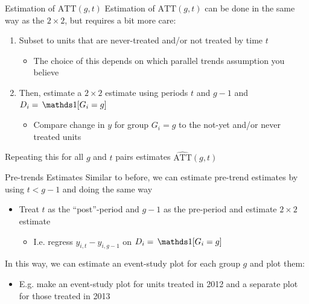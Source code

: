 \documentclass[aspectratio=169,t,11pt,table]{beamer}
\begin{document}
\begin{frame}{Estimation of $\text{ATT}(g,t)$}
  Estimation of $\text{ATT}(g,t)$ can be done in the same way as the $2 \times 2$, but requires a bit more care:

  \bigskip
  \begin{enumerate}
    \item Subset to units that are never-treated and/or not treated by time $t$ 
    \begin{itemize}
      \item The choice of this depends on which parallel trends assumption you believe
    \end{itemize}
 
    \item Then, estimate a $2 \times 2$ estimate using periods $t$ and $g - 1$ and $D_i = \one{G_i = g}$
    \begin{itemize}
      \item Compare change in $y$ for group $G_i = g$ to the not-yet and/or never treated units
    \end{itemize}
  \end{enumerate}

  \bigskip
  Repeating this for all $g$ and $t$ pairs estimates $\hat{\text{ATT}}(g, t)$
\end{frame}

\begin{frame}{Pre-trends Estimates}
  Similar to before, we can estimate pre-trend estimates by using $t < g - 1$ and doing the same way
  \begin{itemize}
    \item Treat $t$ as the ``post''-period and $g - 1$ as the pre-period and estimate $2 \times 2$ estimate
    \begin{itemize}
      \item I.e. regress $y_{i, t} - y_{i, g-1}$ on $D_i = \one{G_i = g}$
    \end{itemize}
  \end{itemize}

  \bigskip
  In this way, we can estimate an event-study plot for each group $g$ and plot them:
  \begin{itemize}
    \item E.g. make an event-study plot for units treated in 2012 and a separate plot for those treated in 2013
  \end{itemize}
\end{frame}
\end{document}
